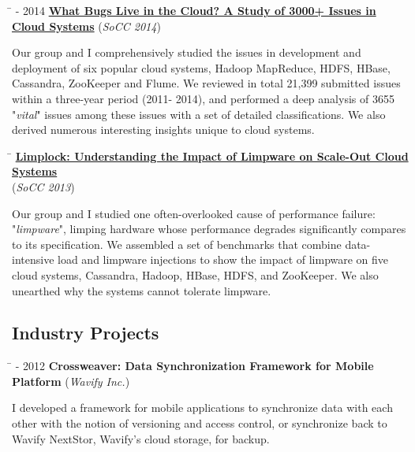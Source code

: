 \documentclass[10pt]{article} %
\begin{document}
\begin{tabbing}
\hspace{2.5cm} \=  - 2014 \>\+ \href{http://ucare.cs.uchicago.edu/pdf/socc14-cbs.pdf}{\textbf{What Bugs Live in the Cloud? A Study of 3000+ Issues in Cloud Systems}} (\textit{SoCC 2014}) \\
\begin{minipage}{\smallertextwidth}
Our group and I comprehensively studied the issues in development and deployment of six
popular cloud systems, Hadoop MapReduce, HDFS, HBase, Cassandra, ZooKeeper and
Flume. We reviewed in total 21,399 submitted issues within a three-year period
(2011- 2014), and performed a deep analysis of 3655 "\textit{vital}" issues among these
issues with a set of detailed classifications. We also derived numerous
interesting insights unique to cloud systems. 
\end{minipage}
\end{tabbing}

\begin{tabbing}
\hspace{2.5cm} \=  \> \href{http://ucare.cs.uchicago.edu/pdf/socc13-limplock.pdf}{\textbf{Limplock: Understanding the Impact of Limpware on Scale-Out Cloud Systems}} \\
\>\+ (\textit{SoCC 2013}) \\
\begin{minipage}{\smallertextwidth}
Our group and I studied one often-overlooked cause of performance failure:
"\textit{limpware}", limping hardware whose performance degrades significantly
compares to its specification. We assembled a set of benchmarks that combine
data-intensive load and limpware injections to show the impact of limpware on
five cloud systems, Cassandra, Hadoop, HBase, HDFS, and ZooKeeper. We
also unearthed why the systems cannot tolerate limpware.
\end{minipage}
\end{tabbing}

\subsection{Industry Projects}

\begin{tabbing}
\hspace{2.5cm} \=  - 2012 \>\+ \textbf{Crossweaver: Data Synchronization Framework for Mobile Platform} (\textit{Wavify Inc.}) \\
\begin{minipage}{\smallertextwidth}
I developed a framework for mobile applications to synchronize data with each
other with the notion of versioning and access control, or synchronize back to
Wavify NextStor, Wavify's cloud storage, for backup.
\end{minipage}
\end{tabbing}
\end{document}

